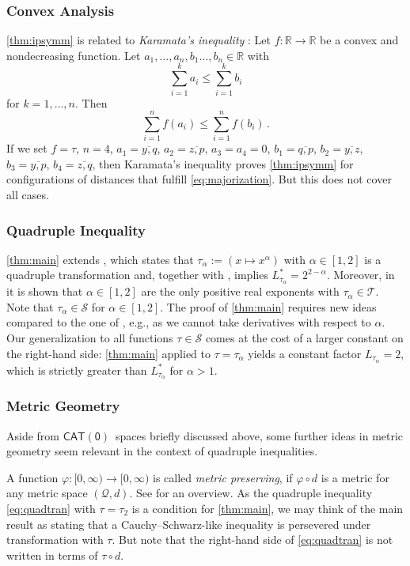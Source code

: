 \documentclass{article}
\newcommand*{\mc}[1]{\mathcal{#1}}
\newcommand*{\ms}[1]{\mathsf{#1}}
\newcommand{\R}{\mathbb{R}}
\newcommand{\Rp}{[0, \infty)} %
\newcommand{\equationFullstop}{\, .}
\newcommand{\eqfs}{\equationFullstop}
\newcommand{\ol}[2]{\overline{#1,#2}}
\newcommand{\cato}{$\ms{CAT(0)}$}
\newcommand{\mtr}{\varphi}
\newcommand{\tran}{\tau}
\newcommand{\Tran}{\mc{T}}
\newcommand{\ctransymbol}{L}
\newcommand{\ctrano}[1]{\ctransymbol_{#1}}
\newcommand{\ctranobest}[1]{\ctransymbol_{#1}^{*}}
\newcommand{\setcc}{\mc S}
\begin{document}
\subsubsection{Convex Analysis}
%
\cref{thm:ipsymm} is related to \textit{Karamata's inequality} \cite{karamata32}: Let $f \colon \R \to\R$ be a convex and nondecreasing function. Let $a_1,\dots, a_n, b_1\dots, b_n \in \R$ with 
\begin{equation}\label{eq:majorization}
	\sum_{i=1}^k a_i \leq \sum_{i=1}^k b_i
\end{equation}
for $k = 1,\dots, n$. Then
\begin{equation}
	\sum_{i=1}^n f(a_i) \leq \sum_{i=1}^n f(b_i) \eqfs
\end{equation}
If we set $f = \tran$, $n = 4$, $a_1 = \ol yq$, $a_2 = \ol zp$, $a_3 = a_4 = 0$, $b_1 = \ol qp$, $b_2 = \ol yz$, $b_3 = \ol yp$, $b_4 = \ol zq$, then Karamata's inequality proves \cref{thm:ipsymm} for configurations of distances that fulfill \eqref{eq:majorization}. But this does not cover all cases.	
%
%
%
\subsubsection{Quadruple Inequality}
%
\cref{thm:main} extends \cite[Theorem 3]{schoetz19}, which states that $\tran_\alpha := (x \mapsto x^\alpha)$ with $\alpha\in[1,2]$ is a quadruple transformation and, together with \cite[Appendix E]{schoetz19}, implies $\ctranobest{\tran_\alpha} = 2^{2-\alpha}$. Moreover, in \cite[Appendix E]{schoetz19} it is shown that $\alpha\in[1,2]$ are the only positive real exponents with $\tran_\alpha\in\Tran$. Note that $\tran_\alpha\in\setcc$ for $\alpha\in[1,2]$. The proof of \cref{thm:main} requires new ideas compared to the one of \cite[Theorem 3]{schoetz19}, e.g., as we cannot take derivatives with respect to $\alpha$. Our generalization to all functions $\tran\in\setcc$ comes at the cost of a larger constant on the right-hand side: \cref{thm:main} applied to $\tran = \tran_\alpha$ yields a constant factor $\ctrano{\tran_\alpha} = 2$, which is strictly greater than $\ctranobest{\tran_\alpha}$ for $\alpha>1$. 
%
%
%
\subsubsection{Metric Geometry}
%
Aside from \cato\ spaces briefly discussed above, some further ideas in metric geometry seem relevant in the context of quadruple inequalities.

A function $\mtr\colon\Rp\to\Rp$ is called \textit{metric preserving}, if $\mtr \circ d$ is a metric for any metric space $(\mc Q, d)$. See \cite{corazza99} for an overview. As the quadruple inequality \eqref{eq:quadtran} with $\tran = \tran_2$ is a condition for \cref{thm:main}, we may think of the main result as stating that a Cauchy--Schwarz-like inequality is persevered under transformation with $\tran$. But note that the right-hand side of \eqref{eq:quadtran} is not written in terms of $\tran \circ d$.
\end{document}
